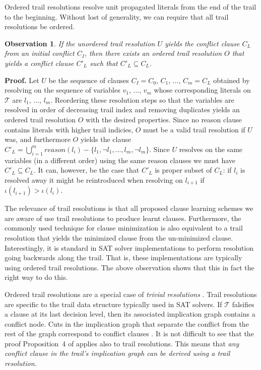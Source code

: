 \documentclass[runningheads]{llncs}
\newcommand{\sat}{SAT\xspace}
\newcommand{\trail}{\ensuremath{\mathcal{T}}}
\newcommand{\trailIdx}[1]{\ensuremath{\iota(#1)}}
\newcommand{\reason}[1]{\ensuremath{\mathit{reason}(#1)}}
\newtheorem{Obs}{Observation}
\newcommand{\whitebox}{\raisebox{.5ex}{\fbox{\hspace*{.2ex}}}}
\begin{document}
Ordered trail resolutions resolve unit propagated literals from the
end of the trail to the beginning. Without lost of generality, we can
require that all trail resolutions be ordered.

\begin{Obs}
    If the unordered trail resolution $U$ yields the conflict clause
    $C_L$ from an initial conflict $C_I$, then there exists an ordered
    trail resolution $O$ that yields a conflict clause $C'_L$ such
    that $C'_L\subseteq C_L$.
\end{Obs}
\noindent
\textbf{Proof.} Let $U$ be the sequence of clauses $C_I = C_0$, $C_1$,
$\ldots$, $C_m= C_L$ obtained by resolving on the sequence of
variables $v_1$, $\ldots$, $v_m$ whose corresponding literals on
$\trail$ are $l_1$, $\ldots$, $l_m$. Reordering these resolution steps
so that the variables are resolved in order of decreasing trail index
and removing duplicates yields an ordered trail resolution $O$ with
the desired properties. Since no reason clause contains literals with
higher trail indicies, $O$ must be a valid trail resolution if $U$
was, and furthermore $O$ yields the clause
$C'_L = \bigcup_{i=1}^m \reason{l_i} - \{l_1, \lnot l_1, \ldots, l_m,
\lnot l_m\}$. Since $U$ resolves on the same variables (in a different
order) using the same reason clauses we must have $C'_L\subseteq
C_L$. It can, however, be the case that $C'_L$ is proper subset of
$C_L$: if $l_i$ is resolved away it might be reintroduced when
resolving on $l_{i+1}$ if $\trailIdx{l_{i+1}}  > \trailIdx{l_i}$.
\whitebox

The relevance of trail resolutions is that all proposed clause
learning schemes we are aware of use trail resolutions to produce
learnt clauses. Furthermore, the commonly used technique for clause
minimization \cite{DBLP:conf/sat/SorenssonB09} is also equivalent to a
trail resolution that yields the minimized clause from the
un-minimized clause. Interestingly, it is standard in \sat solver
implementations to perform resolution going backwards along the
trail. That is, these implementations are typically using ordered
trail resolutions. The above observation shows that this in fact the
right way to do this.

Ordered trail resolutions are a special case of \textit{trivial
  resolutions} \cite{DBLP:journals/jair/BeameKS04}. Trail resolutions
are specific to the trail data structure typically used in \sat
solvers. If $\trail$ falsifies a clause at its last decision level,
then its associated implication graph
\cite{DBLP:journals/tc/Marques-SilvaS99} contains a conflict
node. Cuts in the implication graph that separate the conflict from
the rest of the graph correspond to conflict clauses
\cite{DBLP:journals/jair/BeameKS04}. It is not difficult to see that
the proof Proposition~4 of \cite{DBLP:journals/jair/BeameKS04} applies
also to trail resolutions. This means that \textit{any conflict clause
  in the trail's implication graph can be derived using a trail
  resolution.}
\end{document}
